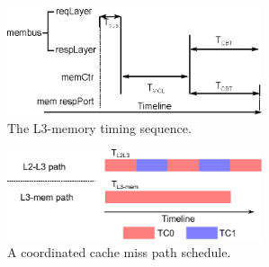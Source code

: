 \begin{figure}
    \begin{center}
        \includegraphics[width=2.9475in]{figs/miss_timing.eps}
        \caption{The L3-memory timing sequence.}
        \label{fig:miss_timing}
    \end{center}
\end{figure}

\begin{figure}
    \begin{center}
        \includegraphics[width=2.9475in]{figs/coordination.eps}
        \caption{A coordinated cache miss path schedule.}
        \label{fig:coordination}
    \end{center}
\end{figure}
